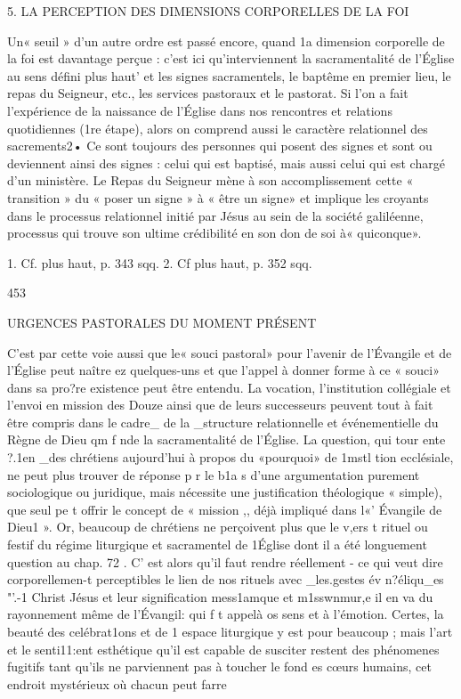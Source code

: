 {{5.	LA PERCEPTION
DES DIMENSIONS CORPORELLES DE LA FOI

Un« seuil » d'un autre ordre est passé encore, quand 1a dimension corporelle de la foi est davantage perçue : c'est ici qu'interviennent la sacramentalité de l'Église au sens défini plus haut' et les signes sacramentels, le baptême en premier lieu, le repas du Seigneur, etc., les services pastoraux et le pastorat.
Si l'on a fait l'expérience de la naissance de l'Église dans nos rencontres et relations quotidiennes (1re étape), alors on comprend aussi le caractère relationnel des sacrements2• Ce sont toujours des personnes qui posent des signes et sont ou deviennent ainsi des signes : celui qui est baptisé, mais aussi celui qui est chargé d'un ministère. Le Repas du Seigneur mène à son accomplissement cette « transition » du « poser un signe » à « être un signe» et implique les croyants dans le processus relationnel initié par Jésus au sein de la société galiléenne, processus qui trouve son ultime crédibilité en son don de soi à« quiconque».

1.	Cf. plus haut, p. 343 sqq.
2.	Cf plus haut, p. 352 sqq.


453
 
URGENCES PASTORALES DU MOMENT PRÉSENT

C'est par cette voie aussi que le« souci pastoral» pour l'avenir de l'Évangile et de l'Église peut naître ez  quelques-uns et que l'appel à donner forme à ce « souci» dans sa pro?re existence peut être entendu. La vocation, l'institution collégiale et l'envoi en mission des Douze ainsi que de leurs successeurs peuvent tout à fait être compris dans le cadre_ de la _structure relationnelle et événementielle du Règne de Dieu qm f nde la sacramentalité de l'Église. La question, qui tour ente ?.1en _des chrétiens aujourd'hui à propos du «pourquoi» de 1mstl tion ecclésiale, ne peut plus trouver de réponse p r le b1a s d'une argumentation purement sociologique ou juridique, mais nécessite une justification théologique « simple), que seul pe t offrir le concept de « mission ,, déjà impliqué dans l«' Évangile
de Dieu1 ».
Or, beaucoup de chrétiens ne perçoivent plus que le v,ers t
rituel ou festif du régime liturgique et sacramentel de 1Église dont il a été longuement question au chap. 72 . C' est alors qu'il faut rendre réellement - ce qui veut dire corporellemen-t
perceptibles le lien de nos rituels avec _les.gestes év n?éliqu_es "'.-1 Christ Jésus et leur signification mess1amque et m1sswnmur,e il en va du rayonnement même de l'Évangil: qui f t appelà	os sens et à l'émotion. Certes, la beauté des celébrat1ons et de 1 espace liturgique y est pour beaucoup ; mais l'art et le senti11:ent esthétique qu'il est capable de susciter restent des phénomenes fugitifs tant qu'ils ne parviennent pas à toucher le fond es cœurs humains, cet endroit mystérieux où chacun peut farre
 
}}
